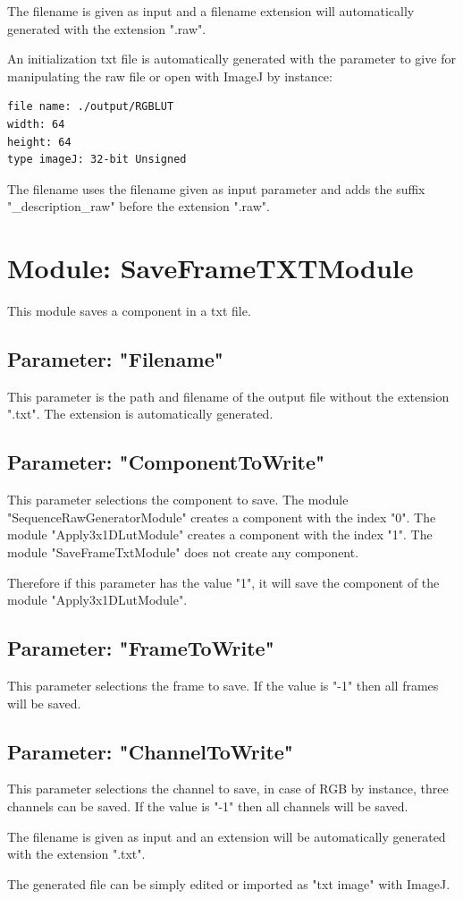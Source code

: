 The filename is given as input and a filename extension will automatically generated with the extension ".raw".

An initialization txt file is automatically generated with the parameter to give for manipulating the raw file or open with ImageJ by instance:

\lstset{language=Scilab}
\begin{lstlisting}
file name: ./output/RGBLUT
width: 64
height: 64
type imageJ: 32-bit Unsigned
\end{lstlisting}

The filename uses the filename given as input parameter and adds the suffix "\_description\_raw" before the extension ".raw".



\section{Module: SaveFrameTXTModule}

This module saves a component in a txt file.

\subsection{Parameter: "Filename"}

This parameter is the path and filename of the output file without the extension ".txt". The extension is automatically generated.

\subsection{Parameter: "ComponentToWrite"}

This parameter selections the component to save. The module "SequenceRawGeneratorModule" creates a component with the index "0". The module "Apply3x1DLutModule" creates a component with the index "1". The module "SaveFrameTxtModule" does not create any component.

Therefore if this parameter has the value "1", it will save the component of the module "Apply3x1DLutModule".

\subsection{Parameter: "FrameToWrite"}
This parameter selections the frame to save. If the value is "-1" then all frames will be saved.

\subsection{Parameter: "ChannelToWrite"}

This parameter selections the channel to save, in case of RGB by instance, three channels can be saved. If the value is "-1" then all channels will be saved.

The filename is given as input and an extension will be automatically generated with the extension ".txt".

The generated file can be simply edited or imported as "txt image" with ImageJ. 






